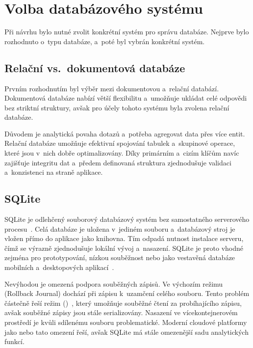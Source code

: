 \section{Volba databázového systému}
\label{sec:implementation:db_choice}

Při návrhu bylo nutné zvolit konkrétní systém pro správu databáze. Nejprve bylo rozhodnuto o~typu databáze, a~poté byl vybrán konkrétní systém.

\subsection{Relační vs.\ dokumentová databáze}
\label{subsec:database:relational_vs_document}

Prvním rozhodnutím byl výběr mezi dokumentovou a~relační databází. Dokumentová databáze nabízí větší flexibilitu a~umožňuje ukládat celé \JSON odpovědi bez striktní struktury, avšak pro účely tohoto systému byla zvolena relační databáze.

Důvodem je analytická povaha dotazů a~potřeba agregovat data přes více entit. Relační databáze umožňuje efektivní spojování tabulek a~skupinové operace, které jsou v~nich dobře optimalizovány. Díky primárním a~cizím klíčům navíc zajišťuje integritu dat a~předem definovaná struktura zjednodušuje validaci a~konzistenci na straně aplikace.

\subsection{SQLite}
\label{subsec:implementation:db_choice:sqlite}

SQLite je odlehčený souborový databázový systém bez samostatného serverového procesu~\cite{sqlite_about}. Celá databáze je uložena v~jediném souboru a~databázový stroj je vložen přímo do aplikace jako knihovna. Tím odpadá nutnost instalace serveru, čímž se výrazně zjednodušuje lokální vývoj a~nasazení. SQLite je proto vhodné zejména pro prototypování, nízkou souběžnost nebo jako vestavěná databáze mobilních a~desktopových aplikací~\cite{sqlite_when_to_use}.

Nevýhodou je omezená podpora souběžných zápisů. Ve výchozím režimu (Rollback Journal) dochází při zápisu k~uzamčení celého souboru. Tento problém částečně řeší \WAL režim ()~\cite{sqlite_wal}, který umožňuje souběžné čtení za probíhajícího zápisu, avšak souběžné zápisy jsou stále serializovány. Nasazení ve vícekontejnerovém prostředí je kvůli sdílenému souboru problematické. Moderní cloudové platformy jako  nebo  tato omezení řeší, avšak SQLite má stále omezenější sadu analytických \SQL funkcí.


